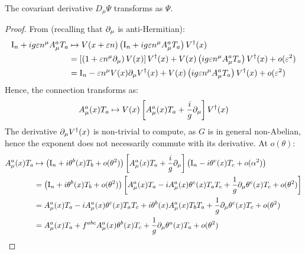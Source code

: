 \begin{proposition}{}{}
  The covariant derivative $ D_\mu \Psi $ transforms as $ \Psi $.
\end{proposition}

\begin{proofbox}
  \begin{proof}
    From  (recalling that $ \partial_\mu $ is anti-Hermitian):
    \begin{equation*}
      \begin{split}
        \mathrm{I}_n + i g \varepsilon n^\mu A_\mu^a T_a
        & \mapsto V(x + \varepsilon n) \left( \mathrm{I}_n + i g \varepsilon n^\mu A_\mu^a T_a \right) V^\dagger(x) \\
        & = \left[ \left( 1 + \varepsilon n^\mu \partial_\mu \right) V(x) \right] V^\dagger(x) + V(x) \left( i g \varepsilon n^\mu A_\mu^a T_a \right) V^\dagger(x) + o(\varepsilon^2) \\
        & = \mathrm{I}_n - \varepsilon n^\mu V(x) \partial_\mu V^\dagger(x) + V(x) \left( i g \varepsilon n^\mu A_\mu^a T_a \right) V^\dagger(x) + o(\varepsilon^2)
      \end{split}
    \end{equation*}
    Hence, the connection transforms as:
    \begin{equation*}
      A_\mu^a(x) T_a \mapsto V(x) \left[ A_\mu^a(x) T_a + \frac{i}{g} \partial_\mu \right] V^\dagger(x)
    \end{equation*}
    The derivative $ \partial_\mu V^\dagger(x) $ is non-trivial to compute, as $ G $ is in general non-Abelian, hence the exponent does not necessarily commute with its derivative. At $ o(\theta) $:
    \begin{equation*}
      \begin{split}
        A_\mu^a(x) T_a
        & \mapsto \left( \tens{I}_n + i \theta^b(x) T_b + o(\theta^2) \right) \left[ A_\mu^a(x) T_a + \frac{i}{g} \pa_\mu \right] \left( \tens{I}_n - i \theta^c(x) T_c + o(\alpha^2) \right) \\
        & = \left( \tens{I}_n + i \theta^b(x) T_b + o(\theta^2) \right) \left[ A_\mu^a(x) T_a - i A_\mu^a(x) \theta^c(x) T_a T_c + \frac{1}{g} \pa_\mu \theta^c(x) T_c + o(\theta^2) \right] \\
        & = A_\mu^a(x) T_a - i A_\mu^a(x) \theta^c(x) T_a T_c + i \theta^b(x) A_\mu^a(x) T_b T_a + \frac{1}{g} \pa_\mu \theta^c(x) T_c + o(\theta^2) \\
        & = A_\mu^a(x) T_a + f^{abc} A_\mu^a(x) \theta^b(x) T_c + \frac{1}{g} \pa_\mu \theta^a(x) T_a + o(\theta^2)

\end{split}
\end{equation*}
\end{proof}
\end{proofbox}
